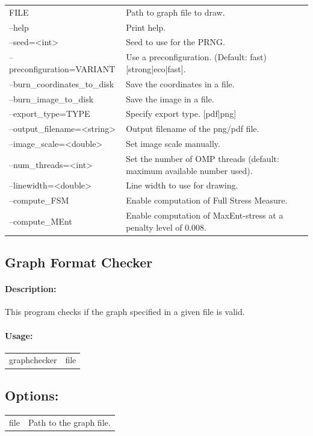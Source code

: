 \documentclass[11pt]{article}
\begin{document}
\begin{tabularx}{\textwidth}{lX}
  FILE                          & Path to graph file to draw.\\
  --help                        & Print help. \\
  --seed=<int>                  & Seed to use for the PRNG.\\
  --preconfiguration=VARIANT    & Use a preconfiguration. (Default: fast) [strong|eco|fast].\\
  --burn\_coordinates\_to\_disk & Save the coordinates in a file.\\
  --burn\_image\_to\_disk       & Save the image in a file.\\
  --export\_type=TYPE           & Specify export type. [pdf|png]\\
  --output\_filename=<string>   & Output filename of the png/pdf file.\\
  --image\_scale=<double>       & Set image scale manually.\\
  --num\_threads=<int>          & Set the number of OMP threads (default: maximum available number used).\\
  --linewidth=<double>          & Line width to use for drawing.\\
  --compute\_FSM                & Enable computation of Full Stress Measure.\\
  --compute\_MEnt               & Enable computation of MaxEnt-stress at a penalty level of 0.008.\\
\end{tabularx}
\subsection{Graph Format Checker}
\paragraph*{Description:} This program checks if the graph specified in a given file is valid. 
\paragraph*{Usage:\\} 
\begin{tabular}{ll}
graphchecker & file
\end{tabular}
\subsection*{Options:\\} 
\begin{tabularx}{\textwidth}{lX}
  file                       & Path to the graph file. \\
\end{tabularx}
\end{document}
